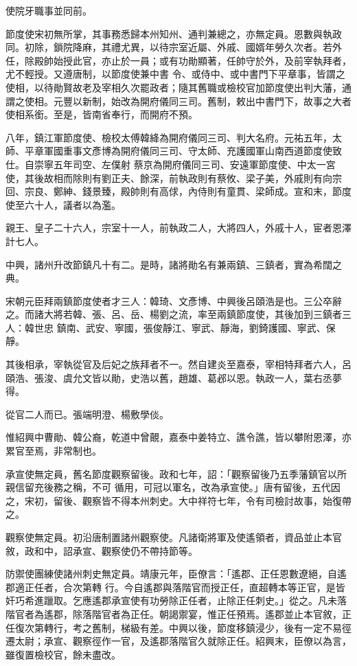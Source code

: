 \begin{pinyinscope}
 使院牙職事並同前。



 節度使宋初無所掌，其事務悉歸本州知州、通判兼總之，亦無定員。恩數與執政同。初除，鎖院降麻，其禮尤異，以待宗室近屬、外戚、國婿年勞久次者。若外任，除殿帥始授此官，亦止於一員；或有功勛顯著，任帥守於外，及前宰執拜者，尤不輕授。又遵唐制，以節度使兼中書
 令、或侍中、或中書門下平章事，皆謂之使相，以待勛賢故老及宰相久次罷政者；隨其舊職或檢校官加節度使出判大藩，通謂之使相。元豐以新制，始改為開府儀同三司。舊制，敕出中書門下，故事之大者使相系銜。至是，皆南省奉行，而開府不預。



 八年，鎮江軍節度使、檢校太傅韓絳為開府儀同三司、判大名府。元祐五年，太師、平章軍國重事文彥博為開府儀同三司、守太師、充護國軍山南西道節度使致仕。自崇寧五年司空、左僕射
 蔡京為開府儀同三司、安遠軍節度使、中太一宮使，其後故相而除則有劉正夫、餘深，前執政則有蔡攸、梁子美，外戚則有向宗回、宗良、鄭紳、錢景臻，殿帥則有高俅，內侍則有童貫、梁師成。宣和末，節度使至六十人，議者以為濫。



 親王、皇子二十六人，宗室十一人，前執政二人，大將四人，外戚十人，宦者恩澤計七人。



 中興，諸州升改節鎮凡十有二。是時，諸將勛名有兼兩鎮、三鎮者，實為希闊之典。



 宋朝元臣拜兩鎮節度使者才三人：韓琦、文彥博、中興後呂頤浩是也。三公卒辭之。而諸大將若韓、張、呂、岳、楊劉之流，率至兩鎮節度使，其後加到三鎮者三人：韓世忠
 鎮南、武安、寧國，張俊靜江、寧武、靜海，劉錡護國、寧武、保靜。



 其後相承，宰執從官及后妃之族拜者不一。然自建炎至嘉泰，宰相特拜者六人，呂頤浩、張浚、虞允文皆以勛，史浩以舊，趙雄、葛邲以恩。執政一人，葉右丞夢得。



 從官二人而已。張端明澄、楊敷學倓。



 惟紹興中曹勛、韓公裔，乾道中曾覿，嘉泰中姜特立、譙令譙，皆以攀附恩澤，亦累官至焉，非常制也。



 承宣使無定員，舊名節度觀察留後。政和七年，詔：「觀察留後乃五季藩鎮官以所親信留充後務之稱，不可
 循用，可冠以軍名，改為承宣使。」唐有留後，五代因之，宋初，留後、觀察皆不得本州刺史。大中祥符七年，令有司檢討故事，始復帶之。



 觀察使無定員。初沿唐制置諸州觀察使。凡諸衛將軍及使遙領者，資品並止本官敘，政和中，詔承宣、觀察使仍不帶持節等。



 防禦使團練使諸州刺史無定員。靖康元年，臣僚言：「遙郡、正任恩數遼絕，自遙郡適正任者，合次第轉
 行。今自遙郡與落階官而授正任，直超轉本等正官，是皆奸巧希進躐取。乞應遙郡承宣使有功勞除正任者，止除正任刺史。」從之。凡未落階官者為遙郡，除落階官者為正任。朝謁禦宴，惟正任預焉。遙郡並止本官敘，正任復次第轉行，考之舊制，梯級有差。中興以後，節度移鎮浸少，後有一定不易徑遷太尉；承宣、觀察徑作一官，及遙郡落階官久就除正任。紹興末，臣僚以為言，雖復置檢校官，餘未盡改。



\end{pinyinscope}